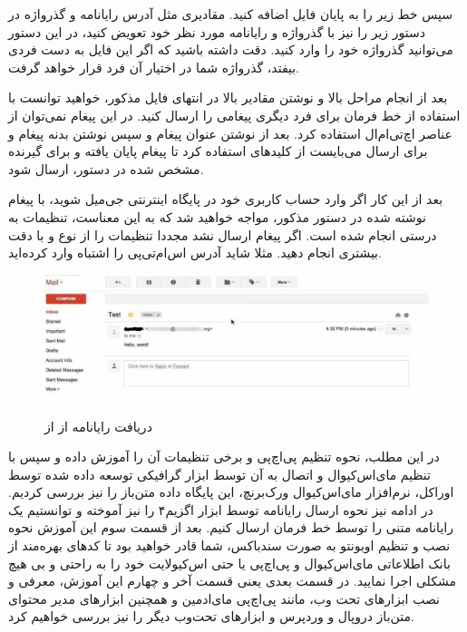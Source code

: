 سپس خط زیر را به پایان فایل اضافه کنید. مقادیری مثل آدرس رایانامه و گذرواژه در دستور زیر را نیز با گذرواژه و رایانامه مورد نظر خود تعویض کنید، در این دستور می‌توانید گذرواژه خود را وارد کنید. دقت داشته باشید که اگر این فایل به دست فردی بیفتد، گذرواژه شما در اختیار آن فرد قرار خواهد گرفت.
\newline
\begin{latin}  
    
\end{latin}
بعد از انجام مراحل بالا و نوشتن مقادیر بالا در انتهای فایل مذکور، خواهید توانست با استفاده از خط فرمان برای فرد دیگری پیغامی را ارسال کنید. در این پیغام نمی‌توان از عناصر اچ‌تی‌ام‌ال استفاده کرد. بعد از نوشتن عنوان پیغام و سپس نوشتن بدنه پیغام و برای ارسال می‌بایست از کلید‌های 
 استفاده کرد تا پیغام پایان یافته و برای گیرنده مشخص شده در دستور، ارسال شود.
\newline
\begin{latin}  
    
\end{latin}
بعد از این کار اگر وارد حساب کاربری خود در پایگاه اینترنتی جی‌میل شوید، با پیغام نوشته شده در دستور مذکور، مواجه خواهید شد که به این معناست، تنظیمات به درستی انجام شده است. اگر پیغام ارسال نشد مجددا تنظیمات را از نوع و با دقت بیشتری انجام دهید. مثلا شاید آدرس اس‌ام‌تی‌پی را اشتباه وارد کرده‌اید.
\begin{figure}
    \includegraphics[width=.9\textwidth ,height=.40\textwidth]{Pic/GMAIL}
    \caption{ دریافت رایانامه از  
        از
    }
    \label{EMAIL-FROM-EXIM}
\end{figure}
در این مطلب، نحوه تنظیم پی‌اچ‌پی و برخی تنظیمات آن را آموزش داده و سپس با تنظیم مای‌اس‌کیوال و اتصال به آن توسط ابزار گرافیکی توسعه داده شده توسط اوراکل، نرم‌افزار مای‌اس‌کیوال ورک‌برنچ، این پایگاه داده متن‌باز را نیز بررسی کردیم. در ادامه نیز نحوه ارسال رایانامه توسط ابزار اگزیم۴ را نیز آموخته و توانستیم یک رایانامه متنی را  توسط خط فرمان ارسال کنیم. بعد از قسمت سوم این آموزش نحوه نصب و تنظیم اوبونتو به صورت سندباکس، شما قادر خواهید بود تا کد‌های بهره‌مند از بانک اطلاعاتی مای‌اس‌کیوال و پی‌اچ‌پی  یا حتی اس‌کیولایت خود را به راحتی و بی هیچ مشکلی اجرا نمایید. در قسمت بعدی یعنی قسمت آخر و چهارم این آموزش، معرفی و نصب ابزارهای تحت وب، مانند پی‌اچ‌پی مای‌ادمین و همچنین ابزارهای مدیر محتوای متن‌باز دروپال و وردپرس و ابزارهای تحت‌وب دیگر را نیز بررسی خواهیم کرد.

